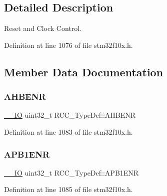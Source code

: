 \subsection{Detailed Description}
Reset and Clock Control. 

Definition at line 1076 of file stm32f10x.\+h.



\subsection{Member Data Documentation}
\mbox{\label{struct_r_c_c___type_def_abaebc9204bbc1708356435a5a01e70eb}} 
\subsubsection{\texorpdfstring{A\+H\+B\+E\+NR}{AHBENR}}
{\footnotesize\ttfamily \hyperlink{core__sc300_8h_aec43007d9998a0a0e01faede4133d6be}{\+\_\+\+\_\+\+IO} uint32\+\_\+t R\+C\+C\+\_\+\+Type\+Def\+::\+A\+H\+B\+E\+NR}



Definition at line 1083 of file stm32f10x.\+h.

\mbox{\label{struct_r_c_c___type_def_aec7622ba90341c9faf843d9ee54a759f}} 
\subsubsection{\texorpdfstring{A\+P\+B1\+E\+NR}{APB1ENR}}
{\footnotesize\ttfamily \hyperlink{core__sc300_8h_aec43007d9998a0a0e01faede4133d6be}{\+\_\+\+\_\+\+IO} uint32\+\_\+t R\+C\+C\+\_\+\+Type\+Def\+::\+A\+P\+B1\+E\+NR}



Definition at line 1085 of file stm32f10x.\+h.

\mbox{\label{struct_r_c_c___type_def_a600f4d6d592f43edb2fc653c5cba023a}} 
